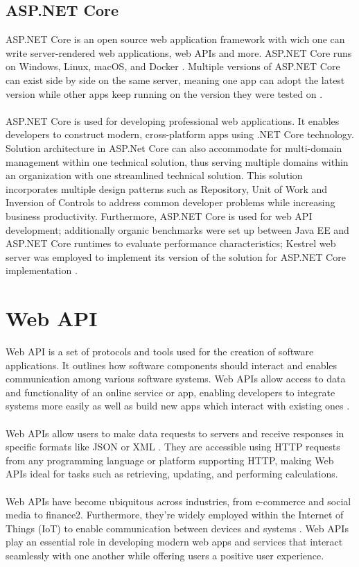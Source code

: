 \documentclass[BIF,Bachelor,nenglish]{twbook}%
\begin{document}
\subsection{ASP.NET Core}
ASP.NET Core is an open source web application framework with wich one can write server-rendered web applications, web \ac{API}s and more. ASP.NET Core runs on Windows, Linux, macOS, and Docker \cite{Bobrov_2023}. Multiple versions of ASP.NET Core can exist side by side on the same server, meaning one app can adopt the latest version while other apps keep running on the version they were tested on \cite{dotnetaspcore}.
\\
\\
ASP.NET Core is used for developing professional web applications. It enables developers to construct modern, cross-platform apps using .NET Core technology. Solution architecture in ASP.Net Core can also accommodate for multi-domain management within one technical solution, thus serving multiple domains within an organization with one streamlined technical solution. This solution incorporates multiple design patterns such as Repository, Unit of Work and Inversion of Controls to address common developer problems while increasing business productivity. Furthermore, ASP.NET Core is used for web \ac{API} development; additionally organic benchmarks were set up between Java EE and ASP.NET Core runtimes to evaluate performance characteristics; Kestrel web server was employed to implement its version of the solution for ASP.NET Core implementation \cite{kro2018}.

\section{Web \ac{API}}
Web \ac{API} is a set of protocols and tools used for the creation of software applications. It outlines how software components should interact and enables communication among various software systems. Web \ac{API}s allow access to data and functionality of an online service or app, enabling developers to integrate systems more easily as well as build new apps which interact with existing ones \cite{soh2015}.
\\
\\
Web \ac{API}s allow users to make data requests to servers and receive responses in specific formats like JSON or XML \cite{tan2016}. They are accessible using \ac{HTTP} requests from any programming language or platform supporting \ac{HTTP}, making Web \ac{API}s ideal for tasks such as retrieving, updating, and performing calculations.
\\
\\
Web \ac{API}s have become ubiquitous across industries, from e-commerce and social media to finance2. Furthermore, they're widely employed within the Internet of Things (IoT) to enable communication between devices and systems \cite{tan2016}. Web \ac{API}s play an essential role in developing modern web apps and services that interact seamlessly with one another while offering users a positive user experience.
\end{document}

